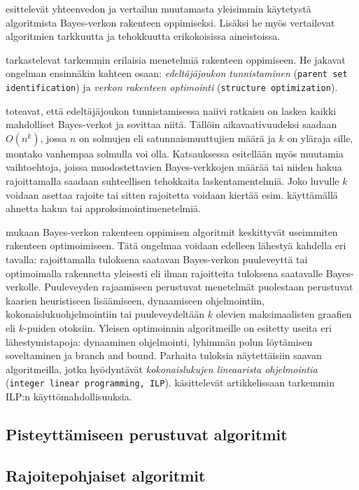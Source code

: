 \citet{mittal_review_2011} esittelevät yhteenvedon ja vertailun muutamasta yleisimmin käytetystä algoritmista Bayes-verkon rakenteen oppimiseksi. Lisäksi he myös vertailevat algoritmien tarkkuutta ja tehokkuutta erikokoisissa aineistoissa.

\citet{scanagatta_survey_2019} tarkastelevat tarkemmin erilaisia menetelmiä rakenteen oppimiseen. He jakavat ongelman ensinnäkin kahteen osaan: \emph{edeltäjäjoukon tunnistaminen} (\texttt{parent set identification}) ja \emph{verkon rakenteen optimointi} (\texttt{structure optimization}). 

\citet{scanagatta_survey_2019} toteavat, että edeltäjäjoukon tunnistamisessa naiivi ratkaisu on laskea kaikki mahdolliset Bayes-verkot ja sovittaa niitä. Tällöin aikavaativuudeksi saadaan $O(n^k)$, jossa $n$ on solmujen eli satunnaismuuttujien määrä ja $k$ on yläraja sille, montako vanhempaa solmulla voi olla. Katsauksessa esitellään myös muutamia vaihtoehtoja, joissa muodostettavien Bayes-verkkojen määrää tai niiden hakua rajoittamalla saadaan suhteellisen tehokkaita laskentamentelmiä. Joko luvulle $k$ voidaan asettaa rajoite tai sitten rajoitetta voidaan kiertää esim. käyttämällä ahnetta hakua tai approksimointimenetelmiä.

\citet{scanagatta_survey_2019} mukaan Bayes-verkon rakenteen oppimisen algoritmit keskittyvät useimmiten rakenteen optimoimiseen. Tätä ongelmaa voidaan edelleen lähestyä kahdella eri tavalla:  rajoittamalla tuloksena saatavan Bayes-verkon puuleveyttä tai optimoimalla rakennetta yleisesti eli ilman rajoitteita tuloksena saatavalle Bayes-verkolle. Puuleveyden rajaamiseen perustuvat menetelmät puolestaan perustuvat kaarien heuristiseen lisäämiseen, dynaamiseen ohjelmointiin, kokonaislukuohjelmointiin tai puuleveydeltään $k$ olevien maksimaalisten graafien eli $k$-puiden otoksiin. Yleisen optimoinnin algoritmeille on esitetty useita eri lähestymistapoja: dynaaminen ohjelmointi, lyhimmän polun löytämisen soveltaminen ja branch and bound. Parhaita tuloksia näytettäisiin saavan algoritmeilla, jotka hyödyntävät \emph{kokonaislukujen lineaarista ohjelmointia} (\texttt{integer linear programming, ILP}). \citet{bartlett_integer_2017} käsittelevät artikkelissaan tarkemmin  ILP:n käyttömahdollisuuksia.

\subsection{Pisteyttämiseen perustuvat algoritmit}
\subsection{Rajoitepohjaiset algoritmit}